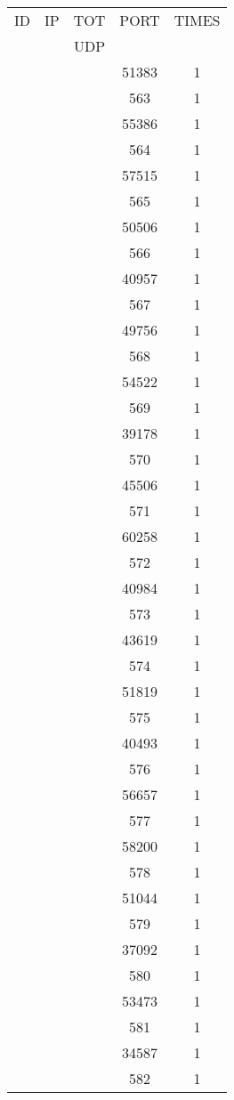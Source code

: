 \documentclass[a4paper]{scrartcl}
\begin{document}
\begin{minipage}[b]{0.5\linewidth}
\begin{tabular}{| c | c | c | c | c |}
\hline
ID & IP & TOT & PORT & TIMES \\ 
   &    & UDP &      &       \\ 
\hline
& & & 51383 & 1 \\ & & & 563 & 1 \\ & & & 55386 & 1 \\ & & & 564 & 1 \\ & & & 57515 & 1 \\ & & & 565 & 1 \\ & & & 50506 & 1 \\ & & & 566 & 1 \\ & & & 40957 & 1 \\ & & & 567 & 1 \\ & & & 49756 & 1 \\ & & & 568 & 1 \\ & & & 54522 & 1 \\ & & & 569 & 1 \\ & & & 39178 & 1 \\ & & & 570 & 1 \\ & & & 45506 & 1 \\ & & & 571 & 1 \\ & & & 60258 & 1 \\ & & & 572 & 1 \\ & & & 40984 & 1 \\ & & & 573 & 1 \\ & & & 43619 & 1 \\ & & & 574 & 1 \\ & & & 51819 & 1 \\ & & & 575 & 1 \\ & & & 40493 & 1 \\ & & & 576 & 1 \\ & & & 56657 & 1 \\ & & & 577 & 1 \\ & & & 58200 & 1 \\ & & & 578 & 1 \\ & & & 51044 & 1 \\ & & & 579 & 1 \\ & & & 37092 & 1 \\ & & & 580 & 1 \\ & & & 53473 & 1 \\ & & & 581 & 1 \\ & & & 34587 & 1 \\ & & & 582 & 1 \\ \hline\end{tabular}\end{minipage} \hfill\begin{minipage}[b]{0.5\linewidth}\begin{tabular}{| c | c | c | c | c |}

\end{tabular}
\end{minipage}
\end{document}
